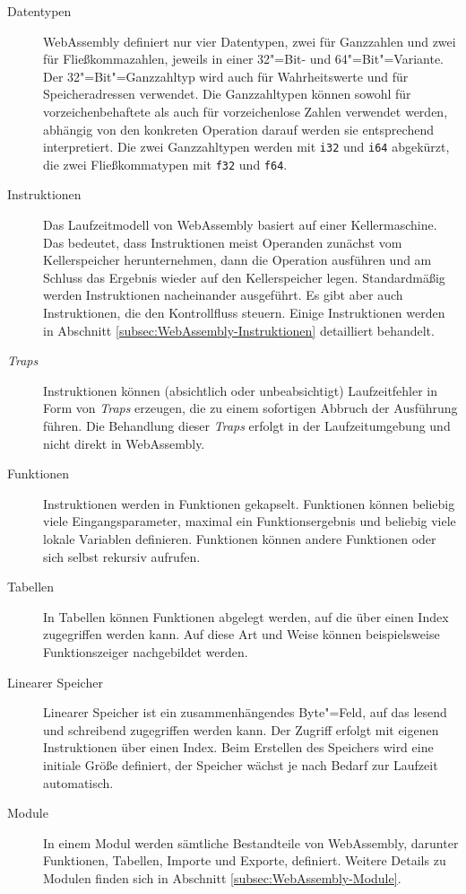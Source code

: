 \begin{description}
    \item[Datentypen] WebAssembly definiert nur vier Datentypen, zwei für Ganzzahlen und zwei für Fließkommazahlen, jeweils in einer 32"=Bit- und 64"=Bit"=Variante. Der 32"=Bit"=Ganzzahltyp wird auch für Wahrheitswerte und für Speicheradressen verwendet. Die Ganzzahltypen können sowohl für vorzeichenbehaftete als auch für vorzeichenlose Zahlen verwendet werden, abhängig von den konkreten Operation darauf werden sie entsprechend interpretiert. Die zwei Ganzzahltypen werden mit \lstinline{i32} und \lstinline{i64} abgekürzt, die zwei Fließkommatypen mit \lstinline{f32} und \lstinline{f64}.
    \item[Instruktionen] Das Laufzeitmodell von WebAssembly basiert auf einer Kellermaschine. Das bedeutet, dass Instruktionen meist Operanden zunächst vom Kellerspeicher herunternehmen, dann die Operation ausführen und am Schluss das Ergebnis wieder auf den Kellerspeicher legen. Standardmäßig werden Instruktionen nacheinander ausgeführt. Es gibt aber auch Instruktionen, die den Kontrollfluss steuern. Einige Instruktionen werden in Abschnitt \ref{subsec:WebAssembly-Instruktionen} detailliert behandelt.
    \item[\emph{Traps}] Instruktionen können (absichtlich oder unbeabsichtigt) Laufzeitfehler in Form von \emph{Traps} erzeugen, die zu einem sofortigen Abbruch der Ausführung führen. Die Behandlung dieser \emph{Traps} erfolgt in der Laufzeitumgebung und nicht direkt in WebAssembly.
    \item[Funktionen] Instruktionen werden in Funktionen gekapselt. Funktionen können beliebig viele Eingangsparameter, maximal ein Funktionsergebnis und beliebig viele lokale Variablen definieren. Funktionen können andere Funktionen oder sich selbst rekursiv aufrufen.
    \item[Tabellen] In Tabellen können Funktionen abgelegt werden, auf die über einen Index zugegriffen werden kann. Auf diese Art und Weise können beispielsweise Funktionszeiger nachgebildet werden. 
    \item[Linearer Speicher] Linearer Speicher ist ein zusammenhängendes Byte"=Feld, auf das lesend und schreibend zugegriffen werden kann. Der Zugriff erfolgt mit eigenen Instruktionen über einen Index. Beim Erstellen des Speichers wird eine initiale Größe definiert, der Speicher wächst je nach Bedarf zur Laufzeit automatisch.
    \item[Module] In einem Modul werden sämtliche Bestandteile von WebAssembly, darunter Funktionen, Tabellen, Importe und Exporte, definiert. Weitere Details zu Modulen finden sich in Abschnitt \ref{subsec:WebAssembly-Module}.
\end{description}

